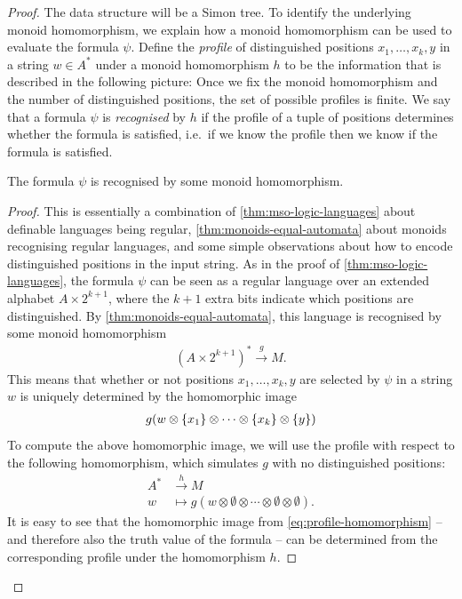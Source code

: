 \begin{proof}
The data structure will be a Simon tree. To identify the underlying monoid homomorphism,  we explain how a monoid homomorphism can be used to evaluate the  \mso formula $\psi$. Define  the \emph{profile} of distinguished positions  $x_1,\ldots,x_k,y$ in a string $w \in A^*$ under a monoid homomorphism $h$ to be the information that is described in the following picture:
Once we fix the monoid homomorphism and the number of distinguished positions, the set of possible profiles is finite. We say that a  formula $\psi$  
is \emph{recognised} by $h$ if the profile of a tuple of positions determines whether the formula is satisfied, i.e.~if we know the profile then we know if the formula is satisfied.
\begin{claim}\label{claim:mso-formula-recognised-by-homomorphism}
    The \mso formula $\psi$   is recognised by some monoid homomorphism.
\end{claim}
\begin{proof}
    This is essentially a combination of \cref{thm:mso-logic-languages} about \mso definable languages being regular,   \cref{thm:monoids-equal-automata} about monoids recognising regular languages, and some simple observations about how to encode distinguished positions in the input string.
    As in the proof of \cref{thm:mso-logic-languages}, the formula $\psi$ can be seen as a regular language over an extended alphabet $A \times 2^{k+1}$, where the $k+1$ extra bits indicate which positions are distinguished. 
    By \cref{thm:monoids-equal-automata}, this language is recognised by some monoid homomorphism
    \begin{align*}
    (A \times 2^{k+1})^* \xrightarrow g M.
    \end{align*}
    This means that whether or not positions $x_1,\ldots,x_k,y$ are selected by $\psi$ in a string $w$ 
    is uniquely determined by the homomorphic image 
    \begin{align}
        \label{eq:profile-homomorphism}
    g(w \otimes \{x_1\} \otimes \cdots \otimes \{x_k\} \otimes \{y\})
    \end{align}
    To compute the above homomorphic image, we will use the profile with respect to  the following homomorphism, which simulates $g$ with no distinguished positions:
    \begin{align*}
    A^* & \xrightarrow h  M \\
    w & \mapsto g(w \otimes \emptyset \otimes \cdots \otimes \emptyset \otimes \emptyset).
    \end{align*}
It is easy to see that the homomorphic image from \eqref{eq:profile-homomorphism} -- and therefore also the truth value of the \mso formula --  can be determined from the corresponding profile under the homomorphism $h$. 
\end{proof}


\end{proof}
